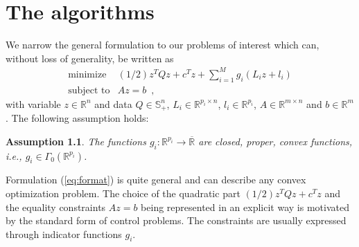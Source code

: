 \documentclass[openany]{now}
\newcommand{\ie}{{\it i.e.}}
\newcommand{\reals}{{\mathbb R}}
\newcommand{\psd}{{\mathbb S}}
\newtheorem{myas}{Assumption}
\begin{document}
\chapter{The algorithms}{\label{ch:algorithms}}
We narrow the general formulation to our problems of interest which can, without loss of generality, be written as 
    \begin{equation}   
    \label{eq:format}
    \begin{array}{ll}
      \mbox{minimize} & (1/2)z^TQz + c^Tz + \sum\limits_{i=1}^M g_i(L_iz+l_i) \\
      \mbox{subject to} & Az = b\enspace, \tag{P} 
    \end{array}
    \end{equation}
with variable $z\in\reals^n$ and data $Q\in\psd_+^n$, $L_i\in\reals^{p_i\times n}$, $l_i\in\reals^{p_i}$, $A\in\reals^{m\times n}$ and $b\in\reals^m$. 
The following assumption holds:
\begin{myas}
The functions $g_i:\reals^{p_i}\rightarrow \overline\reals$ are closed, proper, convex functions, \ie, $g_i\in\Gamma_0(\reals^{p_i})$.
\end{myas}

Formulation (\ref{eq:format}) is quite general and can describe any convex optimization problem. The choice of the quadratic part $(1/2)z^TQz + c^Tz$ and the equality constraints $Az = b$ being represented in an explicit way is motivated by the standard form of control problems. The constraints are usually expressed through indicator functions $g_i$. \\
\end{document}
